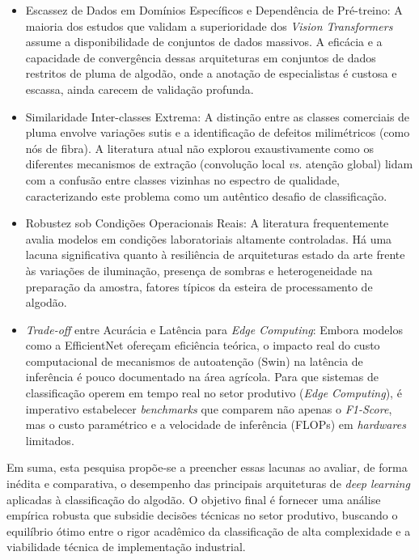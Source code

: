 \begin{itemize}
    \item Escassez de Dados em Domínios Específicos e Dependência de Pré-treino: A maioria dos estudos que validam a superioridade dos \textit{Vision Transformers} assume a disponibilidade de conjuntos de dados massivos. A eficácia e a capacidade de convergência dessas arquiteturas em conjuntos de dados restritos de pluma de algodão, onde a anotação de especialistas é custosa e escassa, ainda carecem de validação profunda.
    
    \item Similaridade Inter-classes Extrema: A distinção entre as classes comerciais de pluma envolve variações sutis e a identificação de defeitos milimétricos (como nós de fibra). A literatura atual não explorou exaustivamente como os diferentes mecanismos de extração (convolução local \textit{vs.} atenção global) lidam com a confusão entre classes vizinhas no espectro de qualidade, caracterizando este problema como um autêntico desafio de classificação.
    
    \item Robustez sob Condições Operacionais Reais: A literatura frequentemente avalia modelos em condições laboratoriais altamente controladas. Há uma lacuna significativa quanto à resiliência de arquiteturas estado da arte frente às variações de iluminação, presença de sombras e heterogeneidade na preparação da amostra, fatores típicos da esteira de processamento de algodão.
    
    \item \textit{Trade-off} entre Acurácia e Latência para \textit{Edge Computing}: Embora modelos como a EfficientNet ofereçam eficiência teórica, o impacto real do custo computacional de mecanismos de autoatenção (Swin) na latência de inferência é pouco documentado na área agrícola. Para que sistemas de classificação operem em tempo real no setor produtivo (\textit{Edge Computing}), é imperativo estabelecer \textit{benchmarks} que comparem não apenas o \textit{F1-Score}, mas o custo paramétrico e a velocidade de inferência (FLOPs) em \textit{hardwares} limitados.
\end{itemize}

Em suma, esta pesquisa propõe-se a preencher essas lacunas ao avaliar, de forma inédita e comparativa, o desempenho das principais arquiteturas de \textit{deep learning} aplicadas à classificação do algodão. O objetivo final é fornecer uma análise empírica robusta que subsidie decisões técnicas no setor produtivo, buscando o equilíbrio ótimo entre o rigor acadêmico da classificação de alta complexidade e a viabilidade técnica de implementação industrial.

